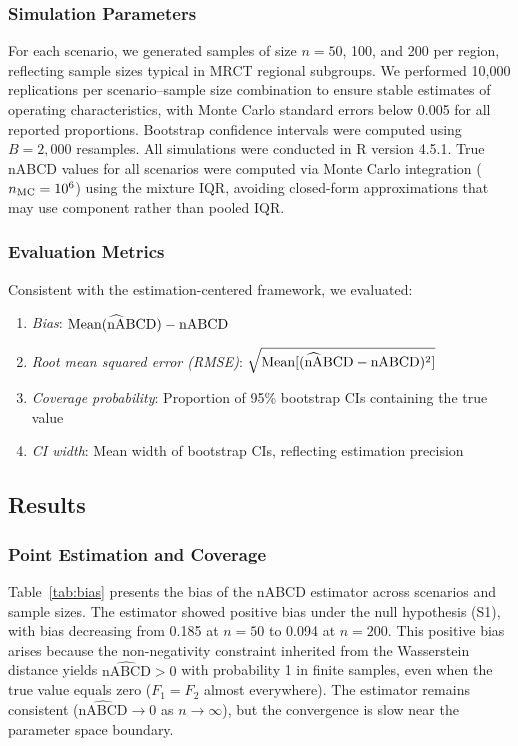 \documentclass[AMA,Times1COL]{WileyNJDv5}
\newcommand{\hnABCD}{\mathrlap{\widehat{\phantom{\text{nA}}}}\text{nABCD}}
\begin{document}
\subsubsection{Simulation Parameters}

For each scenario, we generated samples of size $n = 50$, 100, and 200 per region, reflecting sample sizes typical in MRCT regional subgroups. We performed 10{,}000 replications per scenario--sample size combination to ensure stable estimates of operating characteristics, with Monte Carlo standard errors below 0.005 for all reported proportions. Bootstrap confidence intervals were computed using $B = 2{,}000$ resamples. All simulations were conducted in R version 4.5.1. True nABCD values for all scenarios were computed via Monte Carlo integration ($n_{\textup{MC}} = 10^6$) using the mixture IQR, avoiding closed-form approximations that may use component rather than pooled IQR.

\subsubsection{Evaluation Metrics}

Consistent with the estimation-centered framework, we evaluated:
\begin{enumerate}[1.]
\item \emph{Bias}: $\text{Mean}(\hnABCD) - \text{nABCD}$
\item \emph{Root mean squared error (RMSE)}: $\sqrt{\text{Mean}[(\hnABCD - \text{nABCD})^2]}$
\item \emph{Coverage probability}: Proportion of 95\% bootstrap CIs containing the true value
\item \emph{CI width}: Mean width of bootstrap CIs, reflecting estimation precision
\end{enumerate}

\subsection{Results}\label{sec:sim_results}

\subsubsection{Point Estimation and Coverage}

Table~\ref{tab:bias} presents the bias of the nABCD estimator across scenarios and sample sizes. The estimator showed positive bias under the null hypothesis (S1), with bias decreasing from 0.185 at $n=50$ to 0.094 at $n=200$. This positive bias arises because the non-negativity constraint inherited from the Wasserstein distance yields $\widehat{\text{nABCD}} > 0$ with probability 1 in finite samples, even when the true value equals zero ($F_1 = F_2$ almost everywhere). The estimator remains consistent ($\widehat{\text{nABCD}} \to 0$ as $n \to \infty$), but the convergence is slow near the parameter space boundary.
\end{document}
